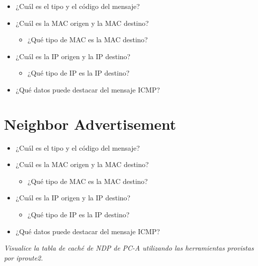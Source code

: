 \documentclass[osajnl,twocolumn,showpacs,superscriptaddress,10pt]{revtex4-1} %
\begin{document}
\begin{itemize}
    \item ¿Cuál es el tipo y el código del mensaje?
    \item ¿Cuál es la MAC origen y la MAC destino?
    
    \begin{itemize}
        \item ¿Qué tipo de MAC es la MAC destino?
    \end{itemize}
    
    \item ¿Cuál es la IP origen y la IP destino?
    
    \begin{itemize}
        \item ¿Qué tipo de IP es la IP destino?
    \end{itemize}
    
    \item ¿Qué datos puede destacar del mensaje ICMP?
\end{itemize}

\section{Neighbor Advertisement}

\begin{itemize}
    \item ¿Cuál es el tipo y el código del mensaje?
    \item ¿Cuál es la MAC origen y la MAC destino?
    
    \begin{itemize}
        \item ¿Qué tipo de MAC es la MAC destino?
    \end{itemize}
    
    \item ¿Cuál es la IP origen y la IP destino?
    
    \begin{itemize}
        \item ¿Qué tipo de IP es la IP destino?
    \end{itemize}
    
    \item ¿Qué datos puede destacar del mensaje ICMP?
\end{itemize}

\textit{Visualice la tabla de caché de NDP de PC-A utilizando las herramientas provistas por
iproute2.}
\end{document}
